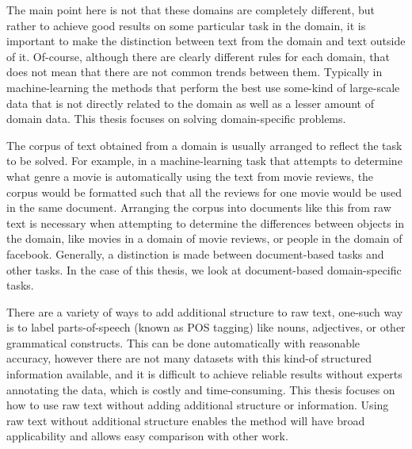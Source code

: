 The main point here is not that these domains are completely different, but rather to achieve good results on some particular task in the domain, it is important to make the distinction between text from the domain and text outside of it. Of-course, although there are clearly different rules for each domain, that does not mean that there are not common trends between them. Typically in machine-learning the methods that perform the best use some-kind of large-scale data that is not directly related to the domain as well as a lesser amount of domain data. This thesis  focuses on solving domain-specific problems.

The corpus of text obtained from a domain is usually arranged to reflect the task to be solved. For example, in a machine-learning task that attempts to determine what genre a movie is automatically using the text from movie reviews, the corpus would be formatted such that all the reviews for one movie would be used in the same document. Arranging the corpus into documents like this from raw text is necessary when attempting to determine the differences between objects in the domain, like movies in a domain of movie reviews, or people in the domain of facebook. Generally, a distinction is made between document-based tasks and other tasks. In the case of this thesis, we look at document-based domain-specific tasks.

There are a variety of ways to add additional structure to raw text, one-such way is to label parts-of-speech (known as POS tagging) like nouns, adjectives, or other grammatical constructs. This can be done automatically with reasonable accuracy, however there are not many datasets with this kind-of structured information available, and it is difficult to achieve reliable results without experts annotating the data, which is costly and time-consuming. This thesis focuses on how to use raw text without adding additional structure or information. Using raw text without additional structure enables the method will have broad applicability and allows easy comparison with other work.


